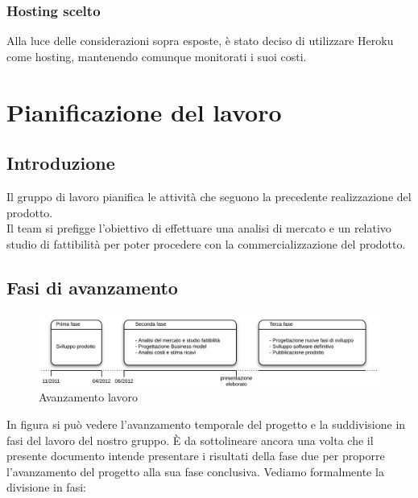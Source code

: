 \subsection{Hosting scelto}
Alla luce delle considerazioni sopra esposte, è stato deciso di utilizzare Heroku come hosting, mantenendo comunque monitorati i suoi costi.









\chapter{Pianificazione del lavoro}
\label{pianificazioneDelLavoro}

\section{Introduzione}
Il gruppo di lavoro pianifica le attività che seguono la precedente realizzazione del prodotto.\\
Il team si prefigge l'obiettivo di effettuare una analisi di mercato e un relativo studio di fattibilità per poter procedere con la commercializzazione del prodotto.\\

\section{Fasi di avanzamento}

\vspace*{0.5cm}

\begin{figure}[H]
\centering
\includegraphics[scale=0.7]{images/cap3/avanzamento.png}
\caption{Avanzamento lavoro}
\end{figure} 

\vspace*{0.5cm}

In figura  si può vedere l'avanzamento temporale del progetto e la suddivisione in fasi del lavoro del nostro gruppo. È da sottolineare ancora una volta che il presente documento intende presentare i risultati della fase due per proporre l'avanzamento del progetto alla sua fase conclusiva. Vediamo formalmente la divisione in fasi: \\

